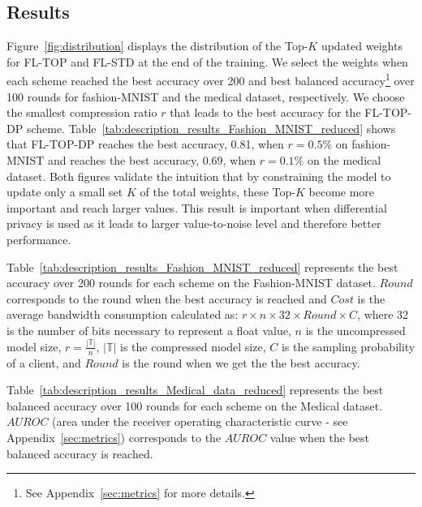 \documentclass[accepted]{uai2021} %
\newcommand{\TOPK}{Top-$K$\xspace}
\begin{document}
\subsection{Results}
\label{sec:results}


Figure~\ref{fig:distribution} displays the distribution of the \TOPK updated weights for FL-TOP and FL-STD at the end of the training. We select the weights when each scheme reached the best accuracy over 200 and best balanced accuracy\footnote{See Appendix~\ref{sec:metrics} for more details.} over 100 rounds for fashion-MNIST and the medical dataset, respectively. We choose the smallest compression ratio $r$ that leads to the best accuracy for the FL-TOP-DP scheme. Table~\ref{tab:description_results_Fashion_MNIST_reduced} shows that FL-TOP-DP reaches the best accuracy, 0.81, when $r=0.5$\% on fashion-MNIST and reaches the best accuracy, 0.69,  when $r=0.1$\% on the medical dataset. Both figures validate the intuition that by constraining the model to update only a small set $K$ of the total weights, these \TOPK become more important and reach larger values. This result is important when differential privacy is used as it leads to larger value-to-noise level and therefore better performance. 


Table~\ref{tab:description_results_Fashion_MNIST_reduced} represents the best accuracy over 200 rounds for each scheme on the Fashion-MNIST dataset. $\mathit{Round}$ corresponds to the round when the best accuracy is reached and $\mathit{Cost}$ is the average bandwidth consumption calculated as: $r \times n \times 32 \times \mathit{Round} \times C$, where 32 is the number of bits necessary to represent a float value, $n$ is the uncompressed model size, $r=\frac{|\mathbb{T}|}{n}$, $|\mathbb{T}|$ is the compressed model size, $C$ is the sampling probability of a client, and $\mathit{Round}$ is the round when we get the the best accuracy.

Table~\ref{tab:description_results_Medical_data_reduced} represents the best balanced accuracy over 100 rounds for each scheme on the Medical dataset. $AUROC$ (area under the receiver operating characteristic curve - see Appendix~\ref{sec:metrics}) corresponds to the $AUROC$ value when the best balanced accuracy is reached.
\end{document}
